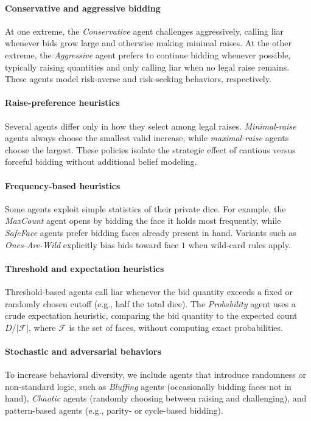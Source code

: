 \paragraph{\textbf{Conservative and aggressive bidding}}
At one extreme, the \emph{Conservative} agent challenges aggressively, calling liar whenever bids grow large and otherwise making minimal raises. At the other extreme, the \emph{Aggressive} agent prefers to continue bidding whenever possible, typically raising quantities and only calling liar when no legal raise remains. These agents model risk-averse and risk-seeking behaviors, respectively.

\paragraph{\textbf{Raise-preference heuristics}}
Several agents differ only in how they select among legal raises. \emph{Minimal-raise} agents always choose the smallest valid increase, while \emph{maximal-raise} agents choose the largest. These policies isolate the strategic effect of cautious versus forceful bidding without additional belief modeling.

\paragraph{\textbf{Frequency-based heuristics}}
Some agents exploit simple statistics of their private dice. For example, the \emph{MaxCount} agent opens by bidding the face it holds most frequently, while \emph{SafeFace} agents prefer bidding faces already present in hand. Variants such as \emph{Ones-Are-Wild} explicitly bias bids toward face \(1\) when wild-card rules apply.

\paragraph{\textbf{Threshold and expectation heuristics}}
Threshold-based agents call liar whenever the bid quantity exceeds a fixed or randomly chosen cutoff (e.g., half the total dice). The \emph{Probability} agent uses a crude expectation heuristic, comparing the bid quantity to the expected count \( D / |\mathcal{F}| \), where \( \mathcal{F} \) is the set of faces, without computing exact probabilities.

\paragraph{\textbf{Stochastic and adversarial behaviors}}
To increase behavioral diversity, we include agents that introduce randomness or non-standard logic, such as \emph{Bluffing} agents (occasionally bidding faces not in hand), \emph{Chaotic} agents (randomly choosing between raising and challenging), and pattern-based agents (e.g., parity- or cycle-based bidding).


